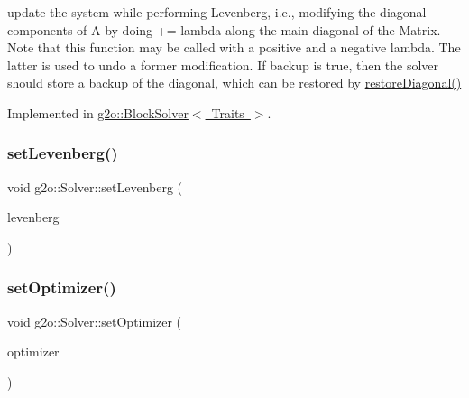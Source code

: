 update the system while performing Levenberg, i.\+e., modifying the diagonal components of A by doing += lambda along the main diagonal of the Matrix. Note that this function may be called with a positive and a negative lambda. The latter is used to undo a former modification. If backup is true, then the solver should store a backup of the diagonal, which can be restored by \mbox{\hyperlink{classg2o_1_1_solver_a3c40dae9b999c4d18e57b02fd0e0ade2}{restore\+Diagonal()}} 

Implemented in \mbox{\hyperlink{classg2o_1_1_block_solver_acc63a23e5b35e4f72d46dc22719aa56f}{g2o\+::\+Block\+Solver$<$ Traits $>$}}.

\mbox{\label{classg2o_1_1_solver_a01e21c08d7ec8c8051de565b5c314fa1}} 
\subsubsection{\texorpdfstring{set\+Levenberg()}{setLevenberg()}}
{\footnotesize\ttfamily void g2o\+::\+Solver\+::set\+Levenberg (\begin{DoxyParamCaption}\item[{bool}]{levenberg }\end{DoxyParamCaption})}

\mbox{\label{classg2o_1_1_solver_af27b647cdc19d99ea5378b443e118bb0}} 
\subsubsection{\texorpdfstring{set\+Optimizer()}{setOptimizer()}}
{\footnotesize\ttfamily void g2o\+::\+Solver\+::set\+Optimizer (\begin{DoxyParamCaption}\item[{\mbox{\hyperlink{classg2o_1_1_sparse_optimizer}{Sparse\+Optimizer}} $\ast$}]{optimizer }\end{DoxyParamCaption})}

\mbox{\label{classg2o_1_1_solver_a30134c828054375b1cc16ede2a879761}} 
